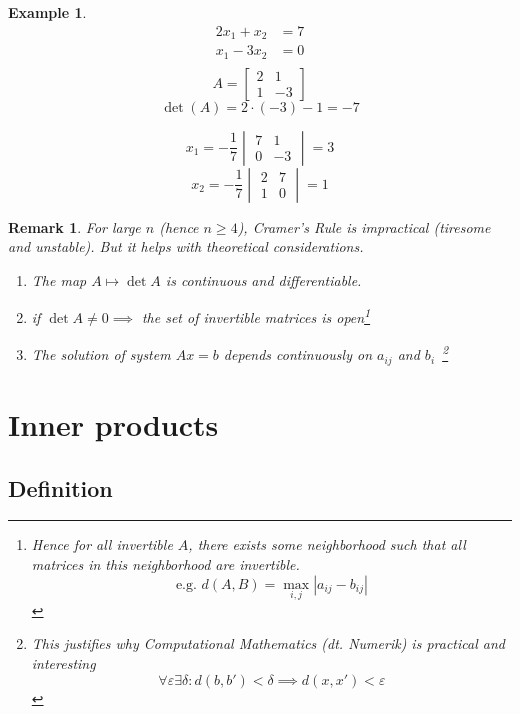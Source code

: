 \documentclass{article}
\newcounter{lecref}[section]
\numberwithin{lecref}{section}
\newtheorem{example}[lecref]{Example}
\newtheorem{remark}[lecref]{Remark}
\newcommand{\card}[1]{\left|#1\right|}
\begin{document}
\begin{example}
  \begin{align*}
    2x_1 + x_2 &= 7 \\
    x_1 - 3x_2 &= 0 \\
  \end{align*}%
%
  \[ A = \begin{bmatrix} 2 & 1 \\ 1 & -3 \end{bmatrix} \]
  \[ \det(A) = 2 \cdot (-3) - 1 = -7 \]

  \[ x_1 = -\frac17 \begin{vmatrix} 7 & 1 \\ 0 & -3 \end{vmatrix} = 3 \]
  \[ x_2 = -\frac17 \begin{vmatrix} 2 & 7 \\ 1 & 0 \end{vmatrix} = 1 \]
\end{example}

\begin{remark}
  For large $n$ (hence $n \geq 4$), Cramer's Rule is impractical (tiresome and unstable).
  But it helps with theoretical considerations.
  \begin{enumerate}
    \item The map $A \mapsto \det{A}$ is continuous and differentiable.
    \item if $\det{A} \neq 0 \implies$ the set of invertible matrices is open\footnote{Hence for all invertible $A$, there exists some neighborhood such that all matrices in this neighborhood are invertible. \[ \text{e.g. } d(A, B) = \max_{i,j} \card{a_{ij} - b_{ij}} \]}
    \item The solution of system $Ax = b$ depends continuously on $a_{ij}$ and $b_i$~\footnote{
      This justifies why Computational Mathematics (dt. \foreignlanguage{german}{Numerik}) is practical and interesting
      \[ \forall \varepsilon \exists \delta: d(b, b') < \delta \implies d(x, x') < \varepsilon \]
    }
  \end{enumerate}
\end{remark}

\section{Inner products}

\subsection{Definition}
\end{document}
